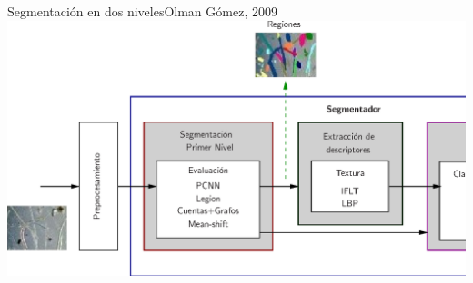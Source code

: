 \documentclass[15pt]{beamer} %
\begin{document}
\begin{frame}{Segmentación en dos niveles}{{\tiny{Olman Gómez, 2009}}}
  \includegraphics[width=\textwidth]{gomezsegm_fixed}
\end{frame}
\end{document}
